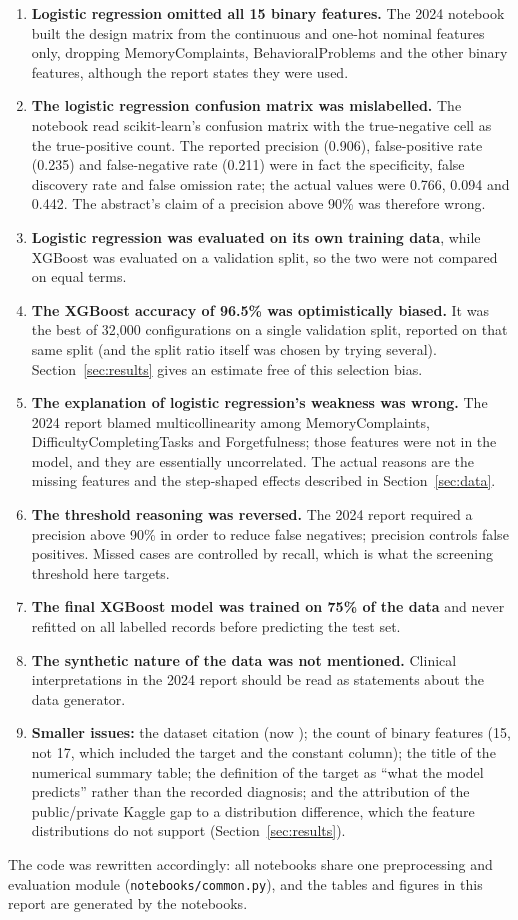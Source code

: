 \documentclass[11pt]{article}
\begin{document}
\begin{enumerate}
  \item \textbf{Logistic regression omitted all 15 binary features.} The 2024 notebook built the
  design matrix from the continuous and one-hot nominal features only, dropping MemoryComplaints,
  BehavioralProblems and the other binary features, although the report states they were used.
  \item \textbf{The logistic regression confusion matrix was mislabelled.} The notebook read
  scikit-learn's confusion matrix with the true-negative cell as the true-positive count. The reported
  precision (0.906), false-positive rate (0.235) and false-negative rate (0.211) were in fact the
  specificity, false discovery rate and false omission rate; the actual values were 0.766, 0.094 and
  0.442. The abstract's claim of a precision above 90\% was therefore wrong.
  \item \textbf{Logistic regression was evaluated on its own training data}, while XGBoost was evaluated
  on a validation split, so the two were not compared on equal terms.
  \item \textbf{The XGBoost accuracy of 96.5\% was optimistically biased.} It was the best of 32,000
  configurations on a single validation split, reported on that same split (and the split ratio itself
  was chosen by trying several). Section~\ref{sec:results} gives an estimate free of this selection bias.
  \item \textbf{The explanation of logistic regression's weakness was wrong.} The 2024 report blamed
  multicollinearity among MemoryComplaints, DifficultyCompletingTasks and Forgetfulness; those features
  were not in the model, and they are essentially uncorrelated. The actual reasons are the missing
  features and the step-shaped effects described in Section~\ref{sec:data}.
  \item \textbf{The threshold reasoning was reversed.} The 2024 report required a precision above 90\%
  in order to reduce false negatives; precision controls false positives. Missed cases are controlled by
  recall, which is what the screening threshold here targets.
  \item \textbf{The final XGBoost model was trained on 75\% of the data} and never refitted on all
  labelled records before predicting the test set.
  \item \textbf{The synthetic nature of the data was not mentioned.} Clinical interpretations in the
  2024 report should be read as statements about the data generator.
  \item \textbf{Smaller issues:} the dataset citation (now \citealp{elkharoua2024dataset}); the count of
  binary features (15, not 17, which included the target and the constant column); the title of the
  numerical summary table; the definition of the target as ``what the model predicts'' rather than the
  recorded diagnosis; and the attribution of the public/private Kaggle gap to a distribution difference,
  which the feature distributions do not support (Section~\ref{sec:results}).
\end{enumerate}
The code was rewritten accordingly: all notebooks share one preprocessing and evaluation module
(\texttt{notebooks/common.py}), and the tables and figures in this report are generated by the notebooks.



\end{document}
